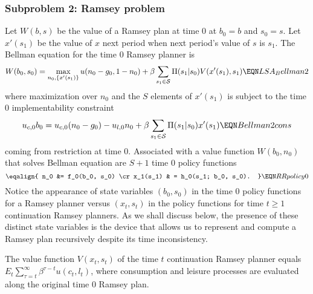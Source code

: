\subsubsection{Subproblem 2:  Ramsey problem}
 Let $W(b, s)$ be the value of a Ramsey plan at time $0$ at $b_0=b$ and $s_0 = s$.
Let $x'(s_1)$ be the value of $x$ next period when next period's value of $s$ is $s_1$.
The Bellman equation for the time $0$ Ramsey planner is
$$ W(b_0, s_0) = \max_{n_0, \{x'(s_1)\}} u(n_0 - g_0, 1 - n_0) + \beta \sum_{s_1 \in {\cal S}} \Pi(s_1| s_0) V( x'(s_1), s_1)  \EQN LSA_Bellman2 $$
where  maximization over $n_0$ and the $S $ elements of $x'(s_1)$ is subject to the time $0$ implementability constraint
$$   u_{c,0} b_0 = u_{c,0} (n_0 - g_0) - u_{l,0} n_0  + \beta \sum_{s_1\in {\cal S}} \Pi(s_1 | s_0) x'(s_1) \EQN Bellman2cons $$
coming from restriction  at time $0$.
Associated with a value function $W(b_0, n_0)$ that solves Bellman equation  are $S +1 $
time $0$ policy functions
$$ \eqalign{ n_0 &= f_0(b_0, s_0) \cr
             x_1(s_1) & = h_0(s_1; b_0, s_0). } \EQN RRpolicy0 $$
Notice the appearance of  state variables $(b_0, s_0)$ in the time $0$ policy functions
 for a Ramsey planner versus  $(x_t, s_t)$ in the policy functions for   time $t \geq 1$ continuation  Ramsey planners.
As we shall discuss below, the presence of these distinct state variables is the device that allows
us to represent and compute a  Ramsey plan  recursively despite its  time inconsistency.
%
%
%



 The value function $V(x_t, s_t)$ of the time $t$ continuation Ramsey planner   equals
$E_t \sum_{\tau = t}^\infty \beta^{\tau - t} u(c_t, l_t)$, where  consumption and leisure processes are evaluated along the original time $0$ Ramsey plan.





